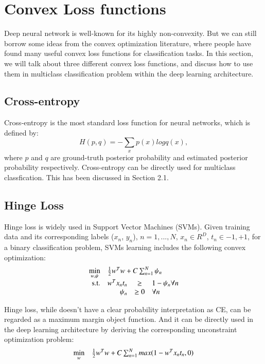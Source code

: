 \documentclass{article} %
\begin{document}
\section{Convex Loss functions}
Deep neural network is well-known for its highly non-convexity. But we can still borrow some ideas from the convex optimization literature, where people have found many useful convex loss functions for classification tasks. In this section, we will talk about three different convex loss functions, and discuss how to use them in multiclass classification problem within the deep learning architecture.


\subsection{Cross-entropy}
Cross-entropy is the most standard loss function for neural networks, which is defined by:
\begin{equation}
H(p,q) = - \sum_{x}p(x)log q(x),
\end{equation}
where $p$ and $q$ are ground-truth posterior probability and estimated posterior probability respectively. Cross-entropy can be directly used for multiclass classfication. This has been discussed in Section 2.1. 

\subsection{Hinge Loss}
Hinge loss is widely used in Support Vector Machines (SVMs). Given training data and its corresponding labels ($x_{n}$, $y_{n}$), $n=1,...,N$, $x_{n} \in R^{D}$, $t_{n} \in {-1,+1}$, for a binary classification problem, SVMs learning includes the following convex optimization:
\begin{equation}
\begin{array}{rrclcl}
\displaystyle \min_{w,\psi} & \multicolumn{3}{l}{ \frac{1}{2} w^{T}w +   C\sum_{n=1}^{N}\psi_{n}}\\
\textrm{s.t.} & w^{T}x_{n}t_{n}& \geq & 1-\psi_{n}  \forall n\\
&\psi_{n} & \geq 0& \forall n \\
\end{array}
\end{equation}

Hinge loss, while doesn't have a clear probability interpretation as CE, can be regarded as a maximum margin object function. And it can be directly used in the deep learning architecture by deriving the corresponding unconstraint optimization problem:
\begin{equation}
\begin{array}{rrclcl}
\displaystyle \min_{w} & \multicolumn{3}{l}{ \frac{1}{2}w^{T}w+C\sum_{n=1}^{N}max(1-w^{T}x_{n}t_{n},0)}\\






\end{array}
\end{equation}
\end{document}
